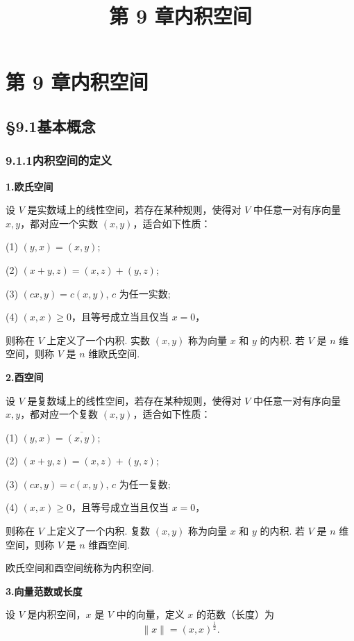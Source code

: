 \documentclass[UTF8, 12pt, fontset=fandol, oneside]{ctexart}
\title{第 9 章\quad 内积空间}
\author{}
\date{}
\begin{document}
\maketitle

\section*{第 9 章\quad 内积空间}

\subsection*{§9.1\quad 基本概念}

\subsubsection*{9.1.1\quad 内积空间的定义}

\noindent\textbf{1.\quad 欧氏空间}

设 $V$ 是实数域上的线性空间，若存在某种规则，使得对 $V$ 中任意一对有序向量 $x,y$，都对应一个实数 $(x,y)$，适合如下性质：

(1) $(y,x)=(x,y)$;

(2) $(x+y,z)=(x,z)+(y,z)$;

(3) $(cx,y)=c(x,y)$, $c$ 为任一实数;

(4) $(x,x)\ge 0$，且等号成立当且仅当 $x=0$，

则称在 $V$ 上定义了一个内积. 实数 $(x,y)$ 称为向量 $x$ 和 $y$ 的内积. 若 $V$ 是 $n$ 维空间，则称 $V$ 是 $n$ 维欧氏空间.

\noindent\textbf{2.\quad 酉空间}

设 $V$ 是复数域上的线性空间，若存在某种规则，使得对 $V$ 中任意一对有序向量 $x,y$，都对应一个复数 $(x,y)$，适合如下性质：

(1) $(y,x)=\overline{(x,y)}$;

(2) $(x+y,z)=(x,z)+(y,z)$;

(3) $(cx,y)=c(x,y)$, $c$ 为任一复数;

(4) $(x,x)\ge 0$，且等号成立当且仅当 $x=0$，

则称在 $V$ 上定义了一个内积. 复数 $(x,y)$ 称为向量 $x$ 和 $y$ 的内积. 若 $V$ 是 $n$ 维空间，则称 $V$ 是 $n$ 维酉空间.

欧氏空间和酉空间统称为内积空间.

\noindent\textbf{3.\quad 向量范数或长度}

设 $V$ 是内积空间，$x$ 是 $V$ 中的向量，定义 $x$ 的范数（长度）为
\[
\|x\|=(x,x)^{\frac12}.
\]
\end{document}
